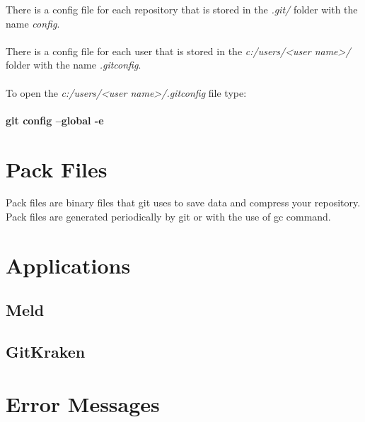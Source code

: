 \begin{refsection}
There is a config file for each repository that is stored in the \emph{.git/} folder with the name \emph{config}.\\
\\
There is a config file for each user that is stored in the \emph{c:/users/<user name>/} folder with the name \emph{.gitconfig}.\\
\\
To open the \emph{c:/users/<user name>/.gitconfig} file type:\\
\\
\textbf{git config --global -e}

\section{Pack Files}

Pack files are binary files that git uses to save data and compress your repository. Pack files are generated periodically by git or with the use of gc command.

\section{Applications}

\subsection{Meld}

%
%
%	
%
%
%
%

\subsection{GitKraken}

\section{Error Messages}


\end{refsection}
